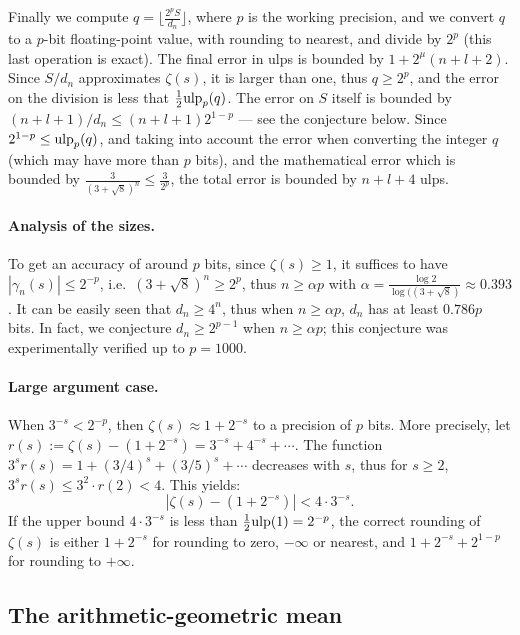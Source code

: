 \documentclass[12pt]{amsart}
\def\ulp{{\rm ulp}}
\begin{document}
Finally we compute $q = \lfloor \frac{2^p S}{d_n} \rfloor$,
where $p$ is the working precision,
and we convert $q$ to a $p$-bit floating-point value,
with rounding to nearest, and divide by $2^p$ (this last operation is
exact).
The final error in ulps is bounded by $1 + 2^{\mu} (n+l+2)$.
Since $S/d_n$ approximates $\zeta(s)$, it is larger than one, thus
$q \geq 2^p$, and the error on the division is less that
$\frac{1}{2}\ulp_p(q)$. The error on $S$ itself is bounded by $(n+l+1)/d_n
\leq (n+l+1) 2^{1-p}$ --- see the conjecture below.
Since $2^{1-p} \leq \ulp_p(q)$, and taking into account the error when
converting the integer $q$ (which may have more than $p$ bits),
and the mathematical error which is bounded by $\frac{3}{(3+\sqrt{8})^n}
\leq \frac{3}{2^p}$, the total error is bounded by $n+l+4$ ulps.

\paragraph{Analysis of the sizes.}
To get an accuracy of around $p$ bits, since $\zeta(s) \geq 1$, it suffices
to have $|\gamma_n(s)| \leq 2^{-p}$, i.e.\ $(3+\sqrt{8})^n \ge 2^p$,
thus $n \ge \alpha p$ with $\alpha = \frac{\log 2}{\log ((3+\sqrt{8})}
\approx 0.393$.
It can be easily seen that $d_n \geq 4^n$, thus when $n \ge \alpha p$,
$d_n$ has at least $0.786 p$ bits.
In fact, we conjecture $d_n \geq 2^{p-1}$ when $n \geq \alpha p$;
this conjecture was experimentally verified up to $p=1000$.

\paragraph{Large argument case.} When $3^{-s} < 2^{-p}$, then $\zeta(s)
\approx 1 + 2^{-s}$ to a precision of $p$ bits. More precisely, let
$r(s) := \zeta(s) - (1 + 2^{-s}) = 3^{-s} + 4^{-s} + \cdots$.
The function $3^s r(s) = 1 + (3/4)^s + (3/5)^s + \cdots$ decreases with $s$,
thus for $s \geq 2$, $3^s r(s) \leq 3^2 \cdot r(2) < 4$. This yields:
\[ |\zeta(s) - (1 + 2^{-s})| < 4 \cdot 3^{-s}. \]
If the upper bound $4 \cdot 3^{-s}$ is less than $\frac{1}{2} \ulp(1)
= 2^{-p}$, the correct rounding of $\zeta(s)$ is either $1 + 2^{-s}$ for
rounding to zero, $-\infty$ or nearest,
and $1 + 2^{-s} + 2^{1-p}$ for rounding to $+\infty$.

\subsection{The arithmetic-geometric mean}
\end{document}
